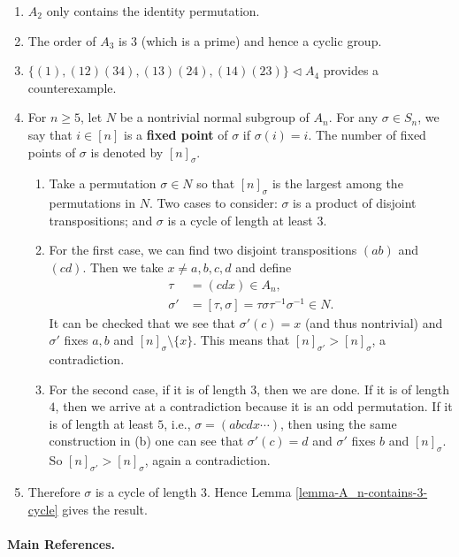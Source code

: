 \begin{sketch}\hfill
	\begin{enumerate}
		\item $A_2$ only contains the identity permutation.
		\item The order of $A_3$ is $3$ (which is a prime) and hence a cyclic group.
		\item $\{(1),(12)(34),(13)(24),(14)(23)\}\lhd A_4$ provides a counterexample.
		\item For $n\geq 5$, let $N$ be a nontrivial normal subgroup of $A_n$.  For any $\sigma \in S_n$, we say that $i \in [n]$ is a \textbf{fixed point} of $\sigma$ if $\sigma(i) = i$. The number of fixed points of $\sigma$ is denoted by $[n]_\sigma$. 
		\begin{enumerate}
			\item Take a permutation $\sigma\in N$ so that $[n]_\sigma$ is the largest among the permutations in $N$. Two cases to consider: $\sigma$ is a product of disjoint transpositions; and $\sigma$ is a cycle of length at least $3$.
			\item For the first case, we can find two disjoint transpositions $(ab)$ and $(cd)$. Then we take $x\neq a,b,c,d$ and define
			\begin{align*}
				\tau &= (cdx)\in A_n, \\
				\sigma' &= [\tau,\sigma] = \tau\sigma\tau^{-1}\sigma^{-1} \in N.
			\end{align*}
			It can be checked that we see that $\sigma'(c) = x$ (and thus nontrivial) and  $\sigma'$ fixes $a,b$ and $[n]_{\sigma}\setminus\{x\}$. This means that $[n]_{\sigma'}>[n]_{\sigma}$, a contradiction.
			\item For the second case, if it is of length $3$, then we are done. If it is of length $4$, then we arrive at a contradiction because it is an odd permutation. If it is of length at least $5$, i.e., $\sigma = (abcdx\cdots)$, then using the same construction in (b) one can see that $\sigma'(c) = d$ and $\sigma'$ fixes $b$ and $[n]_\sigma$. So $[n]_{\sigma'}>[n]_{\sigma}$, again a contradiction.
		\end{enumerate}
		\item Therefore $\sigma $ is a cycle of length $3$. Hence Lemma \ref{lemma-A_n-contains-3-cycle} gives the result. \qedhere
	\end{enumerate}
	
\end{sketch}

\paragraph{Main References.} \cite{Suzuki1982,Lang2002,Hungerford1974,Li2025}


